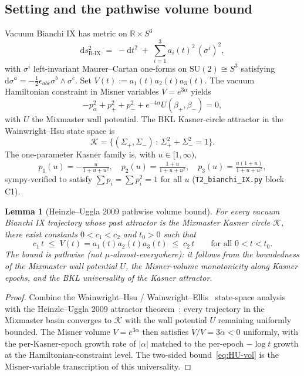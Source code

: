 \documentclass[11pt]{article}
\newtheorem{lemma}[theorem]{Lemma}
\theoremstyle{definition}
\newcommand{\R}{\mathbb{R}}
\newcommand{\BIX}{\mathrm{B\text{-}IX}}
\begin{document}
\subsection{Setting and the pathwise volume bound}\label{sec:bianchi-IX-setting}

Vacuum Bianchi IX has metric on $\R\times S^3$
\begin{equation}\label{eq:metric-BIX}
\mathrm{d}s^2_\BIX \;=\; -\mathrm{d}t^2 \;+\; \sum_{i=1}^3 a_i(t)^2\,(\sigma^i)^2,
\end{equation}
with $\sigma^i$ left-invariant Maurer--Cartan one-forms on $\mathrm{SU}(2)\cong S^3$ satisfying $\mathrm{d}\sigma^a = -\tfrac12\epsilon_{abc}\sigma^b\wedge\sigma^c$. Set $V(t):= a_1(t)a_2(t)a_3(t)$. The vacuum Hamiltonian constraint in Misner variables $V=e^{3\alpha}$ yields
\begin{equation*}
-p_\alpha^2 + p_+^2 + p_-^2 + e^{-4\alpha}U(\beta_+,\beta_-) = 0,
\end{equation*}
with $U$ the Mixmaster wall potential. The BKL Kasner-circle attractor in the Wainwright--Hsu state space is
\begin{equation*}
\mathcal K = \{(\Sigma_+,\Sigma_-)\,:\,\Sigma_+^2 + \Sigma_-^2 = 1\}.
\end{equation*}
The one-parameter Kasner family is, with $u\in[1,\infty)$,
\begin{equation}\label{eq:kasner-u}
p_1(u) = -\tfrac{u}{1+u+u^2},\quad p_2(u) = \tfrac{1+u}{1+u+u^2},\quad p_3(u) = \tfrac{u(1+u)}{1+u+u^2},
\end{equation}
sympy-verified to satisfy $\sum p_i = \sum p_i^2 = 1$ for all $u$ (\texttt{T2\_bianchi\_IX.py} block C1).

\begin{lemma}[Heinzle--Uggla 2009 pathwise volume bound]\label{lem:HU-vol}
For every vacuum Bianchi IX trajectory whose past attractor is the Mixmaster Kasner circle $\mathcal K$, there exist constants $0<c_1<c_2$ and $t_0>0$ such that
\begin{equation}\label{eq:HU-vol}
c_1\,t \;\le\; V(t)=a_1(t)a_2(t)a_3(t) \;\le\; c_2\,t\qquad\text{for all }0<t<t_0.
\end{equation}
The bound is \emph{pathwise} (not $\mu$-almost-everywhere): it follows from the boundedness of the Mixmaster wall potential $U$, the Misner-volume monotonicity along Kasner epochs, and the BKL universality of the Kasner attractor.
\end{lemma}

\begin{proof}
Combine the Wainwright--Hsu / Wainwright--Ellis~\cite{WainwrightEllis1997} state-space analysis with the Heinzle--Uggla 2009 attractor theorem~\cite{HeinzleUgglaAttractor2009}: every trajectory in the Mixmaster basin converges to $\mathcal K$ with the wall potential $U$ remaining uniformly bounded. The Misner volume $V=e^{3\alpha}$ then satisfies $\dot V/V = 3\dot\alpha < 0$ uniformly, with the per-Kasner-epoch growth rate of $|\alpha|$ matched to the per-epoch $-\log t$ growth at the Hamiltonian-constraint level. The two-sided bound~\eqref{eq:HU-vol} is the Misner-variable transcription of this universality.
\end{proof}
\end{document}
